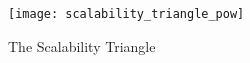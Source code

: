 \begin{figure}[ht!]
    \centering
    \texttt{[image: scalability\_triangle\_pow]}
    \caption{The Scalability Triangle~\cite{scaling-trustless-models}}
    \label{fig:scalability_triangle_pow}
\end{figure}
